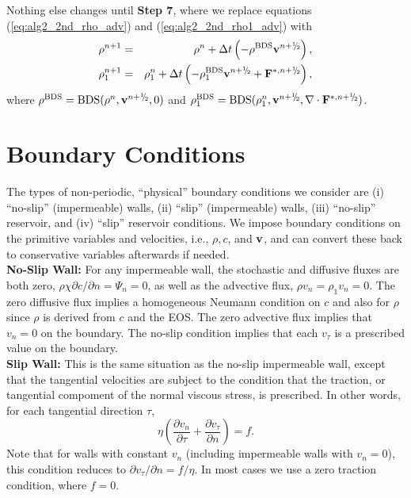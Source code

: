 \documentclass[final]{siamltex}
\newcommand{\sfrac}[2]{\mathchoice
  {\kern0em\raise.5ex\hbox{\the\scriptfont0 #1}\kern-.15em/
   \kern-.15em\lower.25ex\hbox{\the\scriptfont0 #2}}
  {\kern0em\raise.5ex\hbox{\the\scriptfont0 #1}\kern-.15em/
   \kern-.15em\lower.25ex\hbox{\the\scriptfont0 #2}}
  {\kern0em\raise.5ex\hbox{\the\scriptscriptfont0 #1}\kern-.2em/
   \kern-.15em\lower.25ex\hbox{\the\scriptscriptfont0 #2}}
  {#1\!/#2}}
\def\Fb {{\bf F}}
\def\vb {{\bf v}}
\def\myhalf {\sfrac{1}{2}}
\begin{document}
Nothing else changes until {\bf Step 7}, where we replace equations 
(\ref{eq:alg2_2nd_rho_adv}) and (\ref{eq:alg2_2nd_rho1_adv}) with
\begin{eqnarray}
\rho^{n+1} &=& \rho^n + \Delta t\left(-\rho^{\rm BDS}\vb^{n+\myhalf}\right),\\
\rho_1^{n+1} &=& \rho_1^n + \Delta t\left(-\rho_1^{\rm BDS}\vb^{n+\myhalf} + \Fb^{*,n+\myhalf}\right),
\end{eqnarray}
where $\rho^{\rm BDS} = {\rm BDS}(\rho^n,\vb^{n+\myhalf},0)$ and 
$\rho_1^{\rm BDS} = {\rm BDS}(\rho_1^n,\vb^{n+\myhalf},\nabla\cdot\Fb^{*,n+\myhalf})$.

\section{Boundary Conditions}
The types of non-periodic, ``physical'' boundary conditions we consider are 
(i) ``no-slip'' (impermeable) walls,
(ii) ``slip'' (impermeable) walls,
(iii) ``no-slip'' reservoir, and
(iv) ``slip'' reservoir conditions.
We impose boundary conditions on the primitive variables and velocities,
i.e., $\rho,c$, and $\vb$, and can convert these back to conservative
variables afterwards if needed.\\

{\bf No-Slip Wall:}  For any impermeable wall, the stochastic and diffusive
fluxes are both zero, $\rho\chi\partial c/\partial n = \Psi_n = 0$, as well as the 
advective flux, $\rho v_n = \rho_1 v_n = 0$.  The zero
diffusive flux implies a homogeneous Neumann condition on $c$ and also for $\rho$ since $\rho$
is derived from $c$ and the EOS.  The zero advective flux implies that $v_n=0$ on the
boundary.  The no-slip condition implies that each $v_{\tau}$ is a prescribed value
on the boundary.\\

{\bf Slip Wall:}  This is the same situation as the no-slip impermeable
wall, except that the tangential velocities are subject to the condition that the
traction, or tangential compoment of the normal viscous stress, is prescribed.
In other words, for each tangential direction $\tau$,
\begin{equation}
\eta\left(\frac{\partial v_n}{\partial\tau} + \frac{\partial v_{\tau}}{\partial n}\right) = f.\label{eq:free slip}
\end{equation}
Note that for walls with constant $v_n$ (including impermeable walls with $v_n=0$),
this condition reduces to $\partial v_{\tau}/\partial n=f/\eta$.  In most cases we
use a zero traction condition, where $f=0$.\\
\end{document}

